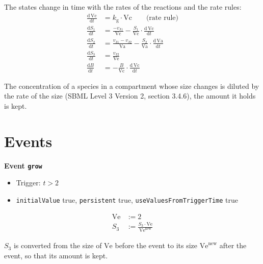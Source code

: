 \documentclass{article}
\begin{document}
The states change in time with the rates of the reactions and the rate rules:
\begin{align*}
  \frac{\mathrm{d} \,\mathrm{Vc}}{\mathrm{d} t} &= k_{\mathrm{g}} \cdot \mathrm{Vc} \qquad \text{(rate rule)} \\
  \frac{\mathrm{d} S_{1}}{\mathrm{d} t} &= \frac{-v_{\mathrm{J1}}}{\mathrm{Vc}} - \frac{S_{1}}{\mathrm{Vc}} \cdot \frac{\mathrm{d} \,\mathrm{Vc}}{\mathrm{d} t} \\
  \frac{\mathrm{d} S_{2}}{\mathrm{d} t} &= \frac{v_{\mathrm{J1}} - v_{\mathrm{J2}}}{\mathrm{Va}} - \frac{S_{2}}{\mathrm{Va}} \cdot \frac{\mathrm{d} \,\mathrm{Va}}{\mathrm{d} t} \\
  \frac{\mathrm{d} S_{3}}{\mathrm{d} t} &= \frac{v_{\mathrm{J2}}}{\mathrm{Ve}} \\
  \frac{\mathrm{d} B}{\mathrm{d} t} &= -\frac{B}{\mathrm{Vc}} \cdot \frac{\mathrm{d} \,\mathrm{Vc}}{\mathrm{d} t}
\end{align*}

The concentration of a species in a compartment whose size changes is diluted by the rate of the size (SBML Level 3 Version 2, section 3.4.6), the amount it holds is kept.

\section{Events}

\textbf{Event \texttt{grow}}

\begin{itemize}
  \item Trigger: $t > 2$
  \item \texttt{initialValue} true, \texttt{persistent} true, \texttt{useValuesFromTriggerTime} true
\end{itemize}
\begin{align*}
  \mathrm{Ve} &\mathrel{:=} 2 \\
  S_{3} &\mathrel{:=} \frac{S_{3} \cdot \mathrm{Ve}}{\mathrm{Ve}^{\mathrm{new}}}
\end{align*}

$S_{3}$ is converted from the size of $\mathrm{Ve}$ before the event to its size $\mathrm{Ve}^{\mathrm{new}}$ after the event, so that its amount is kept.
\end{document}
